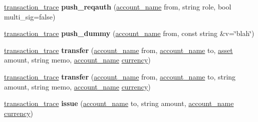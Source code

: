 \begin{DoxyCompactItemize}
\item 
\mbox{\label{classaacio_1_1testing_1_1base__tester_ae2b04a3133131c004292f02aa9f28239}} 
\mbox{\hyperlink{structaacio_1_1chain_1_1transaction__trace}{transaction\+\_\+trace}} {\bfseries push\+\_\+reqauth} (\mbox{\hyperlink{structaacio_1_1chain_1_1name}{account\+\_\+name}} from, string role, bool multi\+\_\+sig=false)
\item 
\mbox{\label{classaacio_1_1testing_1_1base__tester_aa929772ca172f424dcc5d3520dd7fff9}} 
\mbox{\hyperlink{structaacio_1_1chain_1_1transaction__trace}{transaction\+\_\+trace}} {\bfseries push\+\_\+dummy} (\mbox{\hyperlink{structaacio_1_1chain_1_1name}{account\+\_\+name}} from, const string \&v=\char`\"{}blah\char`\"{})
\item 
\mbox{\label{classaacio_1_1testing_1_1base__tester_ac4b762293768bbc54ea0d344374dfaec}} 
\mbox{\hyperlink{structaacio_1_1chain_1_1transaction__trace}{transaction\+\_\+trace}} {\bfseries transfer} (\mbox{\hyperlink{structaacio_1_1chain_1_1name}{account\+\_\+name}} from, \mbox{\hyperlink{structaacio_1_1chain_1_1name}{account\+\_\+name}} to, \mbox{\hyperlink{structaacio_1_1asset}{asset}} amount, string memo, \mbox{\hyperlink{structaacio_1_1chain_1_1name}{account\+\_\+name}} \mbox{\hyperlink{classaacio_1_1currency}{currency}})
\item 
\mbox{\label{classaacio_1_1testing_1_1base__tester_a7df4b122a5d6135b2fdb21dd1d65e7ef}} 
\mbox{\hyperlink{structaacio_1_1chain_1_1transaction__trace}{transaction\+\_\+trace}} {\bfseries transfer} (\mbox{\hyperlink{structaacio_1_1chain_1_1name}{account\+\_\+name}} from, \mbox{\hyperlink{structaacio_1_1chain_1_1name}{account\+\_\+name}} to, string amount, string memo, \mbox{\hyperlink{structaacio_1_1chain_1_1name}{account\+\_\+name}} \mbox{\hyperlink{classaacio_1_1currency}{currency}})
\item 
\mbox{\label{classaacio_1_1testing_1_1base__tester_a5e60943e47e7f823bf735a257173e9ab}} 
\mbox{\hyperlink{structaacio_1_1chain_1_1transaction__trace}{transaction\+\_\+trace}} {\bfseries issue} (\mbox{\hyperlink{structaacio_1_1chain_1_1name}{account\+\_\+name}} to, string amount, \mbox{\hyperlink{structaacio_1_1chain_1_1name}{account\+\_\+name}} \mbox{\hyperlink{classaacio_1_1currency}{currency}})

\end{DoxyCompactItemize}
